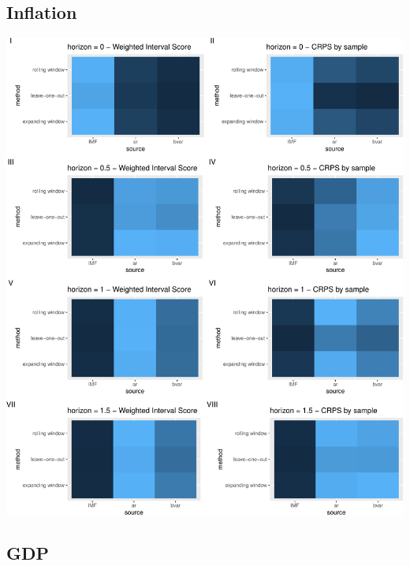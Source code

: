 \documentclass[
]{article}
\begin{document}
\hypertarget{inflation-2}{%
\subsection{Inflation}\label{inflation-2}}

\includegraphics{manuscript_files/figure-latex/cpitileplot-1.pdf}

\hypertarget{gdp-2}{%
\subsection{GDP}\label{gdp-2}}
\end{document}

